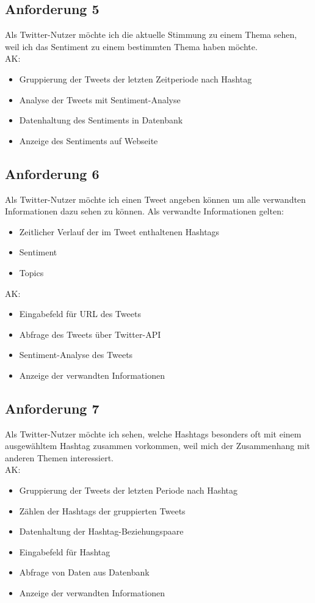 \documentclass[conference]{IEEEtran}
\begin{document}
\subsection{Anforderung 5}
Als Twitter-Nutzer möchte ich die aktuelle Stimmung zu einem Thema sehen,
weil ich das Sentiment zu einem bestimmten Thema haben möchte.
\\
AK:
\begin{itemize}
        \item Gruppierung der Tweets der letzten Zeitperiode nach Hashtag
        \item Analyse der Tweets mit Sentiment-Analyse
        \item Datenhaltung des Sentiments in Datenbank
        \item Anzeige des Sentiments auf Webseite
\end{itemize}

\subsection{Anforderung 6}
Als Twitter-Nutzer möchte ich einen Tweet angeben können um alle verwandten Informationen dazu sehen zu können.
Als verwandte Informationen gelten:
\begin{itemize}
        \item Zeitlicher Verlauf der im Tweet enthaltenen Hashtags
        \item Sentiment
        \item Topics
\end{itemize}
AK:
\begin{itemize}
        \item Eingabefeld für URL des Tweets
        \item Abfrage des Tweets über Twitter-API
        \item Sentiment-Analyse des Tweets
        \item Anzeige der verwandten Informationen
\end{itemize}

\subsection{Anforderung 7}
Als Twitter-Nutzer möchte ich sehen,
welche Hashtags besonders oft mit einem ausgewähltem Hashtag zusammen vorkommen,
weil mich der Zusammenhang mit anderen Themen interessiert.
\\
AK:
\begin{itemize}
        \item Gruppierung der Tweets der letzten Periode nach Hashtag
        \item Zählen der Hashtags der gruppierten Tweets
        \item Datenhaltung der Hashtag-Beziehungspaare
        \item Eingabefeld für Hashtag
        \item Abfrage von Daten aus Datenbank
        \item Anzeige der verwandten Informationen
\end{itemize}
\end{document}
